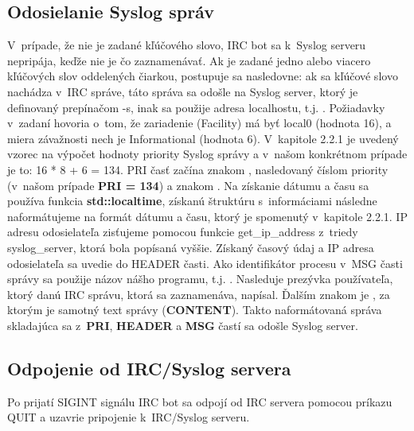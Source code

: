 \subsection{Odosielanie Syslog správ}
V~prípade, že nie je zadané kľúčového slovo, IRC bot sa k~Syslog serveru nepripája, keďže nie je čo zaznamenávať. Ak je zadané jedno alebo viacero kľúčových slov oddelených čiarkou, postupuje sa nasledovne: ak sa kľúčové slovo nachádza v~IRC správe, táto správa sa odošle na Syslog server, ktorý je definovaný prepínačom -s, inak sa použije adresa localhostu, t.j. . Požiadavky v~zadaní hovoria o~tom, že zariadenie (Facility) má byť local0 (hodnota 16), a miera závažnosti nech je Informational (hodnota 6). V~kapitole 2.2.1 je uvedený vzorec na výpočet hodnoty priority Syslog správy a v~našom konkrétnom prípade je to: 16 * 8 + 6 = 134. PRI časť začína znakom \uv{<}, nasledovaný číslom priority (v~našom prípade \textbf{PRI = 134}) a znakom \uv{>}. Na získanie dátumu a času sa používa funkcia \textbf{std::localtime}, získanú štruktúru s~informáciami následne naformátujeme na formát dátumu a času, ktorý je spomenutý v~kapitole 2.2.1. IP adresu odosielateľa zisťujeme pomocou funkcie get\_ip\_address z~triedy syslog\_server, ktorá bola popísaná vyššie. Získaný časový údaj a IP adresa  odosielateľa sa uvedie do HEADER časti. Ako identifikátor procesu v~MSG časti správy sa použije názov nášho programu, t.j. . Nasleduje prezývka používateľa, ktorý danú IRC správu, ktorá sa zaznamenáva, napísal. Ďalším znakom je \uv{:}, za ktorým je samotný text správy (\textbf{CONTENT}). Takto naformátovaná správa skladajúca sa z~\textbf{PRI}, \textbf{HEADER} a \textbf{MSG} častí sa odošle Syslog server.

\subsection{Odpojenie od IRC/Syslog servera}
Po prijatí SIGINT signálu IRC bot sa odpojí od IRC servera pomocou príkazu QUIT a uzavrie pripojenie k~IRC/Syslog serveru.

